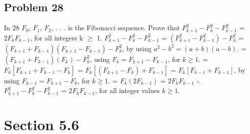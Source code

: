 \documentclass{article}
\begin{document}
	\subsection*{Problem 28}
	In 28 $F_{0}$, $F_{1}$, $F_{2}$, . . . is the Fibonacci sequence.
	\newline
	Prove that $F^{2}_{k+1} - F^{2}_{k} - F^{2}_{k-1}$ = 2$F_{k}$$F_{k-1}$, for all integers k $\geq$ 1.
	\newline
	$F^{2}_{k+1} - F^{2}_{k} - F^{2}_{k-1}$ = $(F^{2}_{k+1} - F^{2}_{k-1}) - F^{2}_{k}$
	\newline
	= $(F_{k+1} + F_{k-1})(F_{k+1} - F_{k-1}) - F^{2}_{k}$, by using $a^{2} - b^{2} = (a+b)(a-b)$.
	\newline
	= $(F_{k+1} + F_{k-1})(F_{k}) - F^{2}_{k}$, using $F_{k} = F_{k+1} - F_{k-1}$, for $k \geq 1$.
	\newline
	= $F_{k}[F_{k+1} + F_{k-1} - F_{k}]$
	\newline
	= $F_{k}[(F_{k+1} - F_{k}) + F_{k-1}]$
	\newline
	= $F_{k}[F_{k-1} + F_{k-1}]$, by using $F_{k-1} = F_{k+1} - F_{k}$, for $k \geq 1$.
	\newline
	= $F_{k}(2F_{k-1})$
	\newline
	= $2F_{k}F_{k-1}$
	\newline
	$\therefore$ $F^{2}_{k+1} - F^{2}_{k} - F^{2}_{k-1}$ = 2$F_{k}$$F_{k-1}$, for all integer values $k \geq 1$.
	
	
	\section*{Section 5.6}
\end{document}
